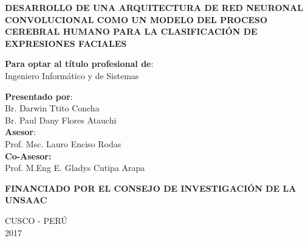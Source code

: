 \documentclass[12pt]{report}
\begin{document}
\begin{center}  {\textsc{\textbf{DESARROLLO DE UNA ARQUITECTURA DE RED NEURONAL
CONVOLUCIONAL COMO UN MODELO DEL PROCESO
CEREBRAL HUMANO PARA LA CLASIFICACIÓN DE
EXPRESIONES FACIALES}}}

\vspace{1.5cm}

{\textbf{Para optar al título profesional de}: \\Ingeniero Informático y de Sistemas\\[0.2cm ]
}

{\textbf{Presentado por}: \\
\hspace{-0.25cm} Br. Darwin Ttito Concha \\ 
\hspace{0.5cm} Br. Paul Dany Flores Atauchi \\[0.2cm ]
\textbf{Asesor}: \\Prof. Msc. Lauro Enciso Rodas \\[0.2cm]
\textbf{Co-Asesor:} \\Prof. M.Eng E. Gladys Cutipa Arapa \\[0.2cm]
}

\vspace{1.0cm}
\begin{center} {\tiny  \textbf{FINANCIADO POR EL CONSEJO DE INVESTIGACIÓN DE LA UNSAAC}} \end{center}
\begin{center} {CUSCO - PERÚ\\
2017} \end{center}
\end{center}

\clearpage
\end{document}
